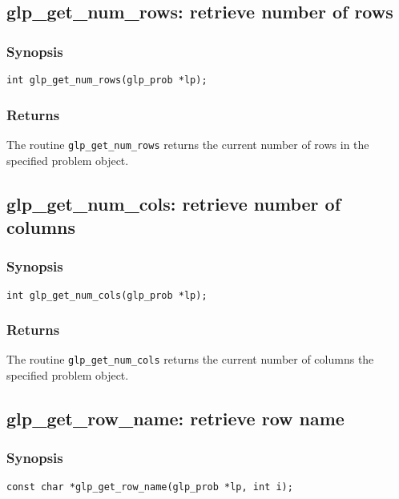 \subsection{glp\_get\_num\_rows: retrieve number of rows}

\subsubsection*{Synopsis}

\begin{verbatim}
int glp_get_num_rows(glp_prob *lp);
\end{verbatim}

\subsubsection*{Returns}

The routine \verb|glp_get_num_rows| returns the current number of rows
in the specified problem object.

\subsection{glp\_get\_num\_cols: retrieve number of columns}

\subsubsection*{Synopsis}

\begin{verbatim}
int glp_get_num_cols(glp_prob *lp);
\end{verbatim}

\subsubsection*{Returns}

The routine \verb|glp_get_num_cols| returns the current number of
columns the specified problem object.

\subsection{glp\_get\_row\_name: retrieve row name}

\subsubsection*{Synopsis}

\begin{verbatim}
const char *glp_get_row_name(glp_prob *lp, int i);
\end{verbatim}

